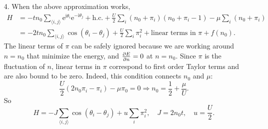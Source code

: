 \documentclass[hyperref, a4paper]{article}
\newcommand*{\ii}{\mathrm{i}}
\newcommand*{\ee}{\mathrm{e}}
\newcommand*{\pair}[1]{\langle #1 \rangle}
\begin{document}
\begin{itemize}
\item[4.] When the above approximation works, 
\[
    \begin{aligned}
        H &= - t n_0 \sum_{\pair{i, j}} \ee^{\ii \theta_i} \ee^{- \ii \theta_j} + \text{h.c.}
        + \frac{U}{2} \sum_i (n_0 + \pi_i) (n_0 + \pi_i - 1) - \mu \sum_i (n_0 + \pi_i) \\
        &= - 2 t n_0 \sum_{\pair{i, j}} \cos(\theta_i - \theta_j) 
        + \frac{U}{2} \sum_i \pi_i^2 + \text{linear terms in $\pi$} + f(n_0).
    \end{aligned}
\]
The linear terms of $\pi$ can be safely ignored 
because we are working around $n = n_0$ that minimize the energy,
and $\pdv{E}{n} = 0$ at $n = n_0$.
Since $\pi$ is the fluctuation of $n$,
linear terms in $\pi$ correspond to first order Taylor terms and are also bound to be zero.
Indeed, this condition connects $n_0$ and $\mu$:
\begin{equation}
    \frac{U}{2} (2 n_0 \pi_i - \pi_i) - \mu \pi_0 = 0 \Rightarrow
    n_0 = \frac{1}{2} + \frac{\mu}{U}.
    \label{eq:n0-mu}
\end{equation}
So 
\begin{equation}
    H = - J \sum_{\pair{i, j}} \cos(\theta_i - \theta_j) 
    + u \sum_i \pi_i^2, \quad J = 2n_0 t, \quad u = \frac{U}{2}.
\end{equation}


\end{itemize}
\end{document}

